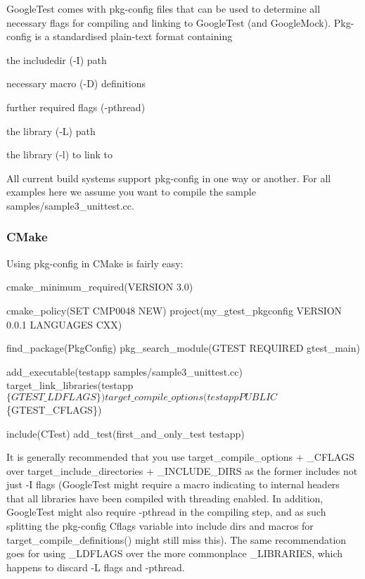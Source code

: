 Google\+Test comes with pkg-\/config files that can be used to determine all necessary flags for compiling and linking to Google\+Test (and Google\+Mock). Pkg-\/config is a standardised plain-\/text format containing


\begin{DoxyItemize}
\item the includedir (-\/I) path
\item necessary macro (-\/D) definitions
\item further required flags (-\/pthread)
\item the library (-\/L) path
\item the library (-\/l) to link to
\end{DoxyItemize}

All current build systems support pkg-\/config in one way or another. For all examples here we assume you want to compile the sample {\ttfamily samples/sample3\+\_\+unittest.\+cc}.

\subsubsection*{C\+Make}

Using {\ttfamily pkg-\/config} in C\+Make is fairly easy\+:


\begin{DoxyCode}
cmake\_minimum\_required(VERSION 3.0)

cmake\_policy(SET CMP0048 NEW)
project(my\_gtest\_pkgconfig VERSION 0.0.1 LANGUAGES CXX)

find\_package(PkgConfig)
pkg\_search\_module(GTEST REQUIRED gtest\_main)

add\_executable(testapp samples/sample3\_unittest.cc)
target\_link\_libraries(testapp $\{GTEST\_LDFLAGS\})
target\_compile\_options(testapp PUBLIC $\{GTEST\_CFLAGS\})

include(CTest)
add\_test(first\_and\_only\_test testapp)
\end{DoxyCode}


It is generally recommended that you use {\ttfamily target\+\_\+compile\+\_\+options} + {\ttfamily \+\_\+\+C\+F\+L\+A\+GS} over {\ttfamily target\+\_\+include\+\_\+directories} + {\ttfamily \+\_\+\+I\+N\+C\+L\+U\+D\+E\+\_\+\+D\+I\+RS} as the former includes not just -\/I flags (Google\+Test might require a macro indicating to internal headers that all libraries have been compiled with threading enabled. In addition, Google\+Test might also require {\ttfamily -\/pthread} in the compiling step, and as such splitting the pkg-\/config {\ttfamily Cflags} variable into include dirs and macros for {\ttfamily target\+\_\+compile\+\_\+definitions()} might still miss this). The same recommendation goes for using {\ttfamily \+\_\+\+L\+D\+F\+L\+A\+GS} over the more commonplace {\ttfamily \+\_\+\+L\+I\+B\+R\+A\+R\+I\+ES}, which happens to discard {\ttfamily -\/L} flags and {\ttfamily -\/pthread}.

